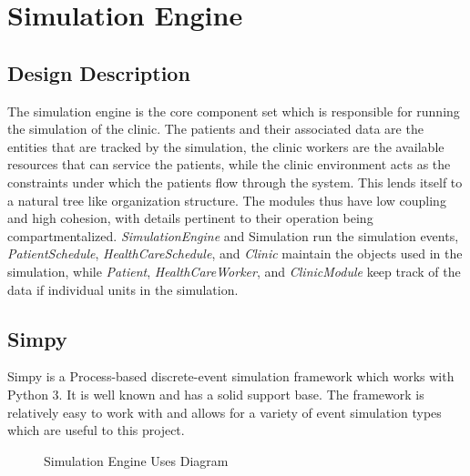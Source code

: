 \documentclass[12pt]{article}
\begin{document}
\section{Simulation Engine}

\subsection{Design Description}
The simulation engine is the core component set which is responsible for running the simulation of the clinic. The patients and their associated data are the entities that are tracked by the simulation, the clinic workers are the available resources that can service the patients, while the clinic environment acts as the constraints under which the patients flow through the system. This lends itself to a natural tree like organization structure. The modules thus have low coupling and high cohesion, with details pertinent to their operation being compartmentalized. \textit{SimulationEngine} and Simulation run the simulation events, \textit{PatientSchedule},\textit{ HealthCareSchedule}, and \textit{Clinic} maintain the objects used in the simulation, while \textit{Patient}, \textit{HealthCareWorker}, and \textit{ClinicModule} keep track of the data if individual units in the simulation.

\subsection{Simpy}
Simpy is a Process-based discrete-event simulation framework which works with Python 3. It is well known and has a solid support base. The framework is relatively easy to work with and allows for a variety of event simulation types which are useful to this project. 

\begin{figure}[H]
\centering
    \caption{Simulation Engine Uses Diagram}
\end{figure}
\end{document}
